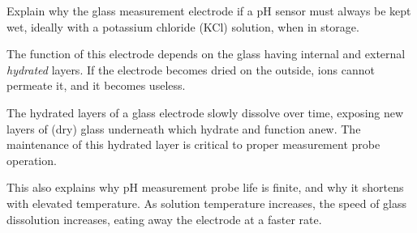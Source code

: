 

Explain why the glass measurement electrode if a pH sensor must always be kept wet, ideally with a potassium chloride (KCl) solution, when in storage.







The function of this electrode depends on the glass having internal and external {\it hydrated} layers.  If the electrode becomes dried on the outside, ions cannot permeate it, and it becomes useless.

The hydrated layers of a glass electrode slowly dissolve over time, exposing new layers of (dry) glass underneath which hydrate and function anew.  The maintenance of this hydrated layer is critical to proper measurement probe operation.

This also explains why pH measurement probe life is finite, and why it shortens with elevated temperature.  As solution temperature increases, the speed of glass dissolution increases, eating away the electrode at a faster rate.











